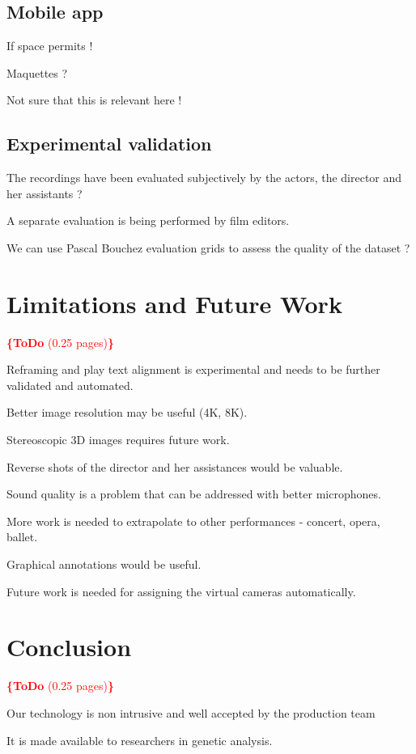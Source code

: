 \documentclass[conference]{IEEEtran}
\newcommand{\todo}[1]{\noindent\textcolor{red}{{\bf \{ToDo} #1{\bf \}}}}
\begin{document}
\subsection{Mobile app} If space permits !

Maquettes ?

Not sure that this is relevant here !


\subsection{Experimental validation}
The recordings have been evaluated subjectively by the actors, the director and her assistants ?

A separate evaluation is being performed by film editors.

We can use Pascal Bouchez evaluation grids to assess the quality of the dataset ?


\section{Limitations and Future  Work}
\todo{(0.25 pages)}

Reframing and play text alignment is experimental and needs to be further validated and automated.

Better image resolution may be useful (4K, 8K).

Stereoscopic 3D images requires future work.

Reverse shots of the director and her assistances would be valuable.

Sound quality is a problem that can be addressed with better microphones.

More work is needed to extrapolate to other performances - concert, opera, ballet.

Graphical annotations would be useful.

Future work is needed for assigning the virtual cameras automatically.



\section{Conclusion}
\todo{(0.25 pages)}

Our technology is non intrusive and well accepted by the production team

It is made available to researchers in genetic analysis.
\end{document}
